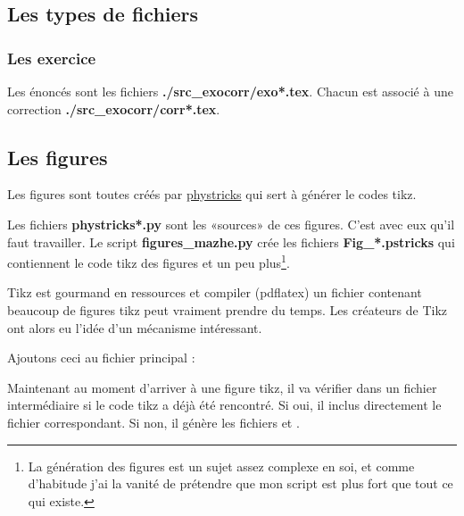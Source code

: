 \subsection{Les types de fichiers}

\subsubsection{Les exercice}

Les énoncés sont les fichiers {\bf  ./src_exocorr/exo*.tex}. Chacun est associé à une correction {\bf ./src_exocorr/corr*.tex}.

\subsection{Les figures}

Les figures sont toutes créés par \href{https://github.com/LaurentClaessens/phystricks}{phystricks} qui sert à générer le codes tikz.

Les fichiers {\bf phystricks*.py} sont les «sources» de ces figures. C'est avec eux qu'il faut travailler. Le script {\bf figures\_mazhe.py} crée les fichiers {\bf Fig\_*.pstricks} qui contiennent le code tikz des figures et un peu plus\footnote{La génération des figures est un sujet assez complexe en soi, et comme d'habitude j'ai la vanité de prétendre que mon script est plus fort que tout ce qui existe.}.

Tikz est gourmand en ressources et compiler (pdflatex) un fichier contenant beaucoup de figures tikz peut vraiment prendre du temps. Les créateurs de Tikz ont alors eu l'idée d'un mécanisme intéressant. 

Ajoutons ceci au fichier principal :


Maintenant au moment d'arriver à une figure tikz, il va vérifier dans un fichier intermédiaire  si le code tikz a déjà été rencontré. Si oui, il inclus directement le fichier  correspondant. Si non, il génère les fichiers  et .


